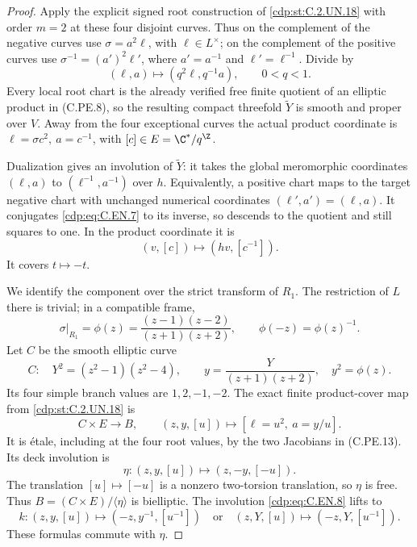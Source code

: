 \begin{proof}
Apply the explicit signed root construction of
\ref{cdp:st:C.2.UN.18} with order $m=2$ at these four disjoint
curves. Thus on the complement of the negative
curves use $\sigma=a^2\ell$, with $\ell\in L^\times$;
on the complement of the positive curves use
$\sigma^{-1}=(a')^2\ell'$, where
$a'=a^{-1}$ and $\ell'=\ell^{-1}$. Divide by
\[
       (\ell,a)\longmapsto(q^2\ell,q^{-1}a),
                  \qquad 0<q<1 .                  \tag{C.EN.7}\label{cdp:eq:C.EN.7}
\]
Every local root chart is the already verified
free finite quotient of an elliptic product in
(C.PE.8), so the resulting compact threefold
$\widetilde Y$ is smooth and proper over $V$.
Away from the four exceptional curves the
actual product coordinate is
$\ell=\sigma c^2,\ a=c^{-1}$, with
$[c]\in E=\C^*/q^{\Z}$.

Dualization gives an involution of
$\widetilde Y$: it takes the global meromorphic
coordinates $(\ell,a)$ to $(\ell^{-1},a^{-1})$
over $h$. Equivalently, a positive chart maps
to the target negative chart with unchanged
numerical coordinates $(\ell',a')=(\ell,a)$.
It conjugates \eqref{cdp:eq:C.EN.7} to its inverse, so
descends to the quotient and still squares
to one. In the product coordinate it is
\[
                       (v,[c])\longmapsto(hv,[c^{-1}]).
                                                               \tag{C.EN.8}\label{cdp:eq:C.EN.8}
\]
It covers $t\mapsto-t$.

We identify the component over the strict
transform of $R_1$. The restriction of $L$
there is trivial; in a compatible frame,
\[
 \sigma|_{R_1}=\phi(z)
   =\frac{(z-1)(z-2)}{(z+1)(z+2)},\qquad
                    \phi(-z)=\phi(z)^{-1}.          \tag{C.EN.9}\label{cdp:eq:C.EN.9}
\]
Let $C$ be the smooth elliptic curve
\[
 C:\quad Y^2=(z^2-1)(z^2-4),\qquad
 y=\frac{Y}{(z+1)(z+2)},\quad y^2=\phi(z).
                                                               \tag{C.EN.10}\label{cdp:eq:C.EN.10}
\]
Its four simple branch values are $1,2,-1,-2$.
The exact finite product-cover map from \ref{cdp:st:C.2.UN.18} is
\[
 C\times E\longrightarrow B,\qquad
 (z,y,[u])\longmapsto[\ell=u^2,\ a=y/u].
                                                               \tag{C.EN.11}\label{cdp:eq:C.EN.11}
\]
It is \'etale, including at the four root values,
by the two Jacobians in (C.PE.13). Its deck
involution is
\[
 \eta:(z,y,[u])\longmapsto(z,-y,[-u]).
                                                               \tag{C.EN.12}\label{cdp:eq:C.EN.12}
\]
The translation $[u]\mapsto[-u]$ is a nonzero
two-torsion translation, so $\eta$ is free.
Thus $B=(C\times E)/\langle\eta\rangle$ is
bielliptic. The involution \eqref{cdp:eq:C.EN.8} lifts to
\[
 k:(z,y,[u])\longmapsto(-z,y^{-1},[u^{-1}])
       \quad\text{or}\quad
       (z,Y,[u])\longmapsto(-z,Y,[u^{-1}]).
                                                               \tag{C.EN.13}\label{cdp:eq:C.EN.13}
\]
These formulas commute with $\eta$.


\end{proof}
